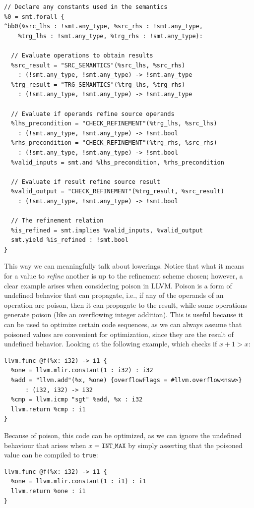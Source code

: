 \begin{verbatim}
// Declare any constants used in the semantics
%0 = smt.forall {
^bb0(%src_lhs : !smt.any_type, %src_rhs : !smt.any_type, 
    %trg_lhs : !smt.any_type, %trg_rhs : !smt.any_type):

  // Evaluate operations to obtain results
  %src_result = "SRC_SEMANTICS"(%src_lhs, %src_rhs) 
    : (!smt.any_type, !smt.any_type) -> !smt.any_type
  %trg_result = "TRG_SEMANTICS"(%trg_lhs, %trg_rhs) 
    : (!smt.any_type, !smt.any_type) -> !smt.any_type

  // Evaluate if operands refine source operands
  %lhs_precondition = "CHECK_REFINEMENT"(%trg_lhs, %src_lhs) 
    : (!smt.any_type, !smt.any_type) -> !smt.bool
  %rhs_precondition = "CHECK_REFINEMENT"(%trg_rhs, %src_rhs) 
    : (!smt.any_type, !smt.any_type) -> !smt.bool
  %valid_inputs = smt.and %lhs_precondition, %rhs_precondition

  // Evaluate if result refine source result
  %valid_output = "CHECK_REFINEMENT"(%trg_result, %src_result) 
    : (!smt.any_type, !smt.any_type) -> !smt.bool

  // The refinement relation
  %is_refined = smt.implies %valid_inputs, %valid_output
  smt.yield %is_refined : !smt.bool
}
\end{verbatim}

This way we can meaningfully talk about lowerings. Notice that what it means for a value to 
\emph{refine} another is up to the refinement scheme chosen; however, a clear example arises when 
considering poison in LLVM. Poison is a form of undefined behavior that can propagate, i.e., if any of 
the operands of an operation are poison, then it can propagate to the result, while some operations generate 
poison (like an overflowing integer addition). This is useful because it can be used to optimize 
certain code sequences, as we can always assume that poisoned values are convenient for optimization, 
since they are the result of undefined behavior. Looking at the following example, which checks if $x+1 > x$:

\begin{verbatim}
llvm.func @f(%x: i32) -> i1 {
  %one = llvm.mlir.constant(1 : i32) : i32
  %add = "llvm.add"(%x, %one) {overflowFlags = #llvm.overflow<nsw>} 
      : (i32, i32) -> i32
  %cmp = llvm.icmp "sgt" %add, %x : i32
  llvm.return %cmp : i1
}
\end{verbatim}

Because of poison, this code can be optimized, as we can ignore the undefined behaviour that
arises when $x = \texttt{INT\_MAX}$ by simply asserting that the poisoned value can be 
compiled to \texttt{true}:
\begin{verbatim}
llvm.func @f(%x: i32) -> i1 {
  %one = llvm.mlir.constant(1 : i1) : i1
  llvm.return %one : i1
}
\end{verbatim}

